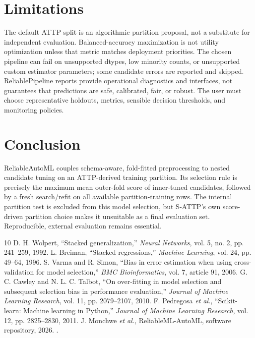 ﻿\documentclass[conference]{IEEEtran}
\begin{document}
\section{Limitations}
The default ATTP split is an algorithmic partition proposal, not a substitute for independent evaluation. Balanced-accuracy maximization is not utility optimization unless that metric matches deployment priorities. The chosen pipeline can fail on unsupported dtypes, low minority counts, or unsupported custom estimator parameters; some candidate errors are reported and skipped. ReliablePipeline reports provide operational diagnostics and interfaces, not guarantees that predictions are safe, calibrated, fair, or robust. The user must choose representative holdouts, metrics, sensible decision thresholds, and monitoring policies.

\section{Conclusion}
ReliableAutoML couples schema-aware, fold-fitted preprocessing to nested candidate tuning on an ATTP-derived training partition. Its selection rule is precisely the maximum mean outer-fold score of inner-tuned candidates, followed by a fresh search/refit on all available partition-training rows. The internal partition test is excluded from this model selection, but S-ATTP's own score-driven partition choice makes it unsuitable as a final evaluation set. Reproducible, external evaluation remains essential.

\begin{thebibliography}{10}
 D. H. Wolpert, ``Stacked generalization,'' \emph{Neural Networks}, vol. 5, no. 2, pp. 241--259, 1992.
 L. Breiman, ``Stacked regressions,'' \emph{Machine Learning}, vol. 24, pp. 49--64, 1996.
 S. Varma and R. Simon, ``Bias in error estimation when using cross-validation for model selection,'' \emph{BMC Bioinformatics}, vol. 7, article 91, 2006.
 G. C. Cawley and N. L. C. Talbot, ``On over-fitting in model selection and subsequent selection bias in performance evaluation,'' \emph{Journal of Machine Learning Research}, vol. 11, pp. 2079--2107, 2010.
 F. Pedregosa \emph{et al.}, ``Scikit-learn: Machine learning in Python,'' \emph{Journal of Machine Learning Research}, vol. 12, pp. 2825--2830, 2011.
 J. Monchwe \emph{et al.}, ReliableML-AutoML, software repository, 2026. \projecturl.
\end{thebibliography}
\end{document}
